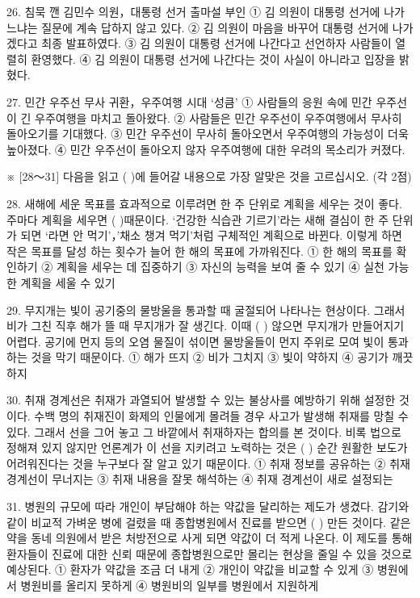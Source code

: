 \documentclass[12pt]{article}
\begin{document}
\begin{enumerate}[1.]
26.
침묵 깬 김민수 의원，대통령 선거 출마설 부인
① 김 의원이 대통령 선거에 나가느냐는 질문에 계속 답하지 않고 있다.
② 김 의원이 마음을 바꾸어 대통령 선거에 나가겠다고 최종 발표하였다.
③ 김 의원이 대통령 선거에 나간다고 선언하자 사람들이 열렬히 환영했다.
④ 김 의원이 대통령 선거에 나간다는 것이 사실이 아니라고 입장을 밝혔다.


27.
민간 우주선 무사 귀환，우주여행 시대 ‘성큼’
① 사람들의 응원 속에 민간 우주선이 긴 우주여행을 마치고 돌아왔다.
② 사람들은 민간 우주선이 우주여행에서 무사히 돌아오기를 기대했다.
③ 민간 우주선이 무사히 돌아오면서 우주여행의 가능성이 더욱 높아졌다.
④ 민간 우주선이 돌아오지 않자 우주여행에 대한 우려의 목소리가 커졌다.




※ [28～31] 다음을 읽고 (   )에 들어갈 내용으로 가장 알맞은 것을 고르십시오. (각 2점)

28.
  새해에 세운 목표를 효과적으로 이루려면 한 주 단위로 계획을 세우는
것이 좋다. 주마다 계획을 세우면 (     )때문이다. ‘건강한
식습관 기르기’라는 새해 결심이 한 주 단위가 되면 ‘라면 안 먹기’，'채소
챙겨 먹기’처럼 구체적인 계획으로 바뀐다. 이렇게 하면 작은 목표를 달성
하는 횟수가 늘어 한 해의 목표에 가까워진다.
① 한 해의 목표를 확인하기
② 계획을 세우는 데 집중하기
③ 자신의 능력을 보여 줄 수 있기
④ 실천 가능한 계획을 세울 수 있기


29.
  무지개는 빛이 공기중의 물방울을 통과할 때 굴절되어 나타나는
현상이다. 그래서 비가 그친 직후 해가 뜰 때 무지개가 잘 생긴다. 이때
(      ) 않으면 무지개가 만들어지기 어렵다. 공기에 먼지 등의
오염 물질이 섞이면 물방울들이 먼지 주위로 모여 빛이 통과하는 것을
막기 때문이다.
① 해가 뜨지
② 비가 그치지
③ 빛이 약하지
④ 공기가 깨끗하지


30.
  취재 경계선은 취재가 과열되어 발생할 수 있는 불상사를 예방하기
위해 설정한 것이다. 수백 명의 취재진이 화제의 인물에게 몰려들 경우
사고가 발생해 취재를 망칠 수 있다. 그래서 선을 그어 놓고 그 바깥에서
취재하자는 합의를 본 것이다. 비록 법으로 정해져 있지 않지만 언론계가
이 선을 지키려고 노력하는 것은 (      ) 순간 원활한 보도가
어려워진다는 것을 누구보다 잘 알고 있기 때문이다.
① 취재 정보를 공유하는
② 취재 경계선이 무너지는
③ 취재 내용을 잘못 해석하는
④ 취재 경계선이 새로 설정되는


31.
  병원의 규모에 따라 개인이 부담해야 하는 약값을 달리하는 제도가
생겼다. 감기와 같이 비교적 가벼운 병에 걸렸을 때 종합병원에서 진료를
받으면 (      ) 만든 것이다. 같은 약을 동네 의원에서 받은
처방전으로 사게 되면 약값이 더 적게 나온다. 이 제도를 통해 환자들이
진료에 대한 신뢰 때문에 종합병원으로만 몰리는 현상을 줄일 수 있을
것으로 예상된다.
① 환자가 약값을 조금 더 내게
② 개인이 약값을 비교할 수 있게
③ 병원에서 병원비를 올리지 못하게
④ 병원비의 일부를 병원에서 지원하게





\end{enumerate}
\end{document}
